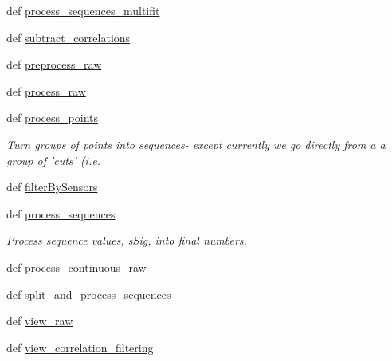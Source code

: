 \begin{DoxyCompactItemize}
\begin{DoxyCompactList}
\begin{quotation}
\end{quotation}
\end{DoxyCompactList}\item 
def \hyperlink{namespacerepo_1_1programs_1_1pythonpackages_1_1pr_1_1SPfuncs_aa986fff9d1f1b5354e43e972289e5844}{process\-\_\-sequences\-\_\-multifit}
\item 
def \hyperlink{namespacerepo_1_1programs_1_1pythonpackages_1_1pr_1_1SPfuncs_ae33ce81936d04fd605560ec75ffe4a12}{subtract\-\_\-correlations}
\item 
def \hyperlink{namespacerepo_1_1programs_1_1pythonpackages_1_1pr_1_1SPfuncs_aa45dbb6291e4944f3ba2718a3d0ee001}{preprocess\-\_\-raw}
\item 
def \hyperlink{namespacerepo_1_1programs_1_1pythonpackages_1_1pr_1_1SPfuncs_a5d91f2e7930fdc007f010659068307f9}{process\-\_\-raw}
\item 
def \hyperlink{namespacerepo_1_1programs_1_1pythonpackages_1_1pr_1_1SPfuncs_a7265a1148ca13e5fb7961b297a214d13}{process\-\_\-points}
\begin{DoxyCompactList}\small\item\em Turn groups of points into sequences-\/ except currently we go directly from a a group of 'cuts' (i.\-e. \end{DoxyCompactList}\item 
def \hyperlink{namespacerepo_1_1programs_1_1pythonpackages_1_1pr_1_1SPfuncs_aefa37b595edec764011c69c3202787f6}{filter\-By\-Sensors}
\item 
def \hyperlink{namespacerepo_1_1programs_1_1pythonpackages_1_1pr_1_1SPfuncs_a98d08fa254a21b0b0895f424f7006dbd}{process\-\_\-sequences}
\begin{DoxyCompactList}\small\item\em Process sequence values, s\-Sig, into final numbers. \end{DoxyCompactList}\item 
def \hyperlink{namespacerepo_1_1programs_1_1pythonpackages_1_1pr_1_1SPfuncs_a9ae89d50fa931a7cc863400505be38b1}{process\-\_\-continuous\-\_\-raw}
\item 
def \hyperlink{namespacerepo_1_1programs_1_1pythonpackages_1_1pr_1_1SPfuncs_ae43119e40ee34e8e5f67a1088548adb6}{split\-\_\-and\-\_\-process\-\_\-sequences}
\item 
def \hyperlink{namespacerepo_1_1programs_1_1pythonpackages_1_1pr_1_1SPfuncs_a9c4d4bc9bf9302d2690f560af0d9982b}{view\-\_\-raw}
\item 
def \hyperlink{namespacerepo_1_1programs_1_1pythonpackages_1_1pr_1_1SPfuncs_af195e86c16fec9d60d1ac20dbe5d1f19}{view\-\_\-correlation\-\_\-filtering}

\end{DoxyCompactItemize}
